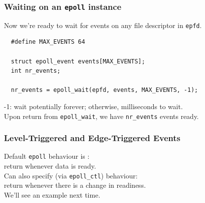 \documentclass[aspectratio=43]{beamer}
\newenvironment{changemargin}[1]{%
  \begin{list}{}{%
    \setlength{\topsep}{0pt}%
    \setlength{\leftmargin}{#1}%
    \setlength{\rightmargin}{1em}
    \setlength{\listparindent}{\parindent}%
    \setlength{\itemindent}{\parindent}%
    \setlength{\parsep}{\parskip}%
  }%
  \item[]}{\end{list}}
\begin{document}
\begin{frame}[fragile]
  \frametitle{Waiting on an {\tt epoll} instance}
  \begin{changemargin}{2em}
    Now we're ready to wait for events on any file descriptor in {\tt epfd}.
    \begin{lstlisting}
  #define MAX_EVENTS 64

  struct epoll_event events[MAX_EVENTS];
  int nr_events;

  nr_events = epoll_wait(epfd, events, MAX_EVENTS, -1);
    \end{lstlisting}

-1: wait potentially forever; otherwise, milliseconds to wait.\\[1em]

Upon return from {\tt epoll\_wait}, we have {\tt nr\_events} events ready.

  \end{changemargin}
\end{frame}

\begin{frame}
  \frametitle{Level-Triggered and Edge-Triggered Events}
  \begin{changemargin}{2em}
    Default {\tt epoll} behaviour is :\\
    \quad return whenever data is ready.\\[1em]

    Can also specify (via {\tt epoll\_ctl})  behaviour:\\
    \quad return whenever there is a change in readiness.\\[1em]

    We'll see an example next time.

  \end{changemargin}
\end{frame}
\end{document}
